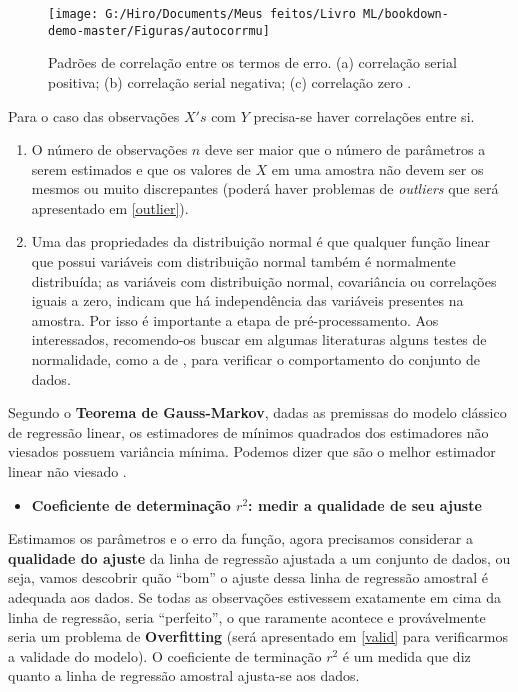 \documentclass[
]{book}
\providecommand{\tightlist}{%
  \setlength{\itemsep}{0pt}\setlength{\parskip}{0pt}}
\begin{document}
\begin{figure}

{\centering \texttt{[image: G:/Hiro/Documents/Meus feitos/Livro ML/bookdown-demo-master/Figuras/autocorrmu]} 

}

\caption{Padrões de correlação entre os termos de erro. (a) correlação serial positiva; (b) correlação serial negativa; (c) correlação zero \citet{gujarati2011econometria}.}\label{fig:autocorrmu}
\end{figure}



Para o caso das observações \(X's\) com \(Y\) precisa-se haver correlações entre si.

\begin{enumerate}
\def\labelenumi{\arabic{enumi}.}
\setcounter{enumi}{4}
\item
  O número de observações \(n\) deve ser maior que o número de parâmetros a serem estimados e que os valores de \(X\) em uma amostra não devem ser os mesmos ou muito discrepantes (poderá haver problemas de \emph{outliers} que será apresentado em \ref{outlier}).
\item
  Uma das propriedades da distribuição normal é que qualquer função linear que possui variáveis com distribuição normal também é normalmente distribuída; as variáveis com distribuição normal, covariância ou correlações iguais a zero, indicam que há independência das variáveis presentes na amostra. Por isso é importante a etapa de pré-processamento. Aos interessados, recomendo-os buscar em algumas literaturas alguns testes de normalidade, como a de \citep{shapiro1965analysis}, para verificar o comportamento do conjunto de dados.
\end{enumerate}

Segundo o \textbf{Teorema de Gauss-Markov}, dadas as premissas do modelo clássico de regressão linear, os estimadores de mínimos quadrados dos estimadores não viesados possuem variância mínima. Podemos dizer que são o melhor estimador linear não viesado \citep{gujarati2011econometria}.

\begin{itemize}
\tightlist
\item
  \textbf{Coeficiente de determinação \(r^2\): medir a qualidade de seu ajuste}
\end{itemize}

Estimamos os parâmetros e o erro da função, agora precisamos considerar a \textbf{qualidade do ajuste} da linha de regressão ajustada a um conjunto de dados, ou seja, vamos descobrir quão ``bom'' o ajuste dessa linha de regressão
amostral é adequada aos dados. Se todas as observações estivessem exatamente em cima da linha de regressão, seria ``perfeito'', o que raramente acontece e provávelmente seria um problema de \textbf{Overfitting} (será apresentado em \ref{valid} para verificarmos a validade do modelo). O coeficiente de terminação \(r^2\) é um medida que diz quanto a linha de regressão
amostral ajusta-se aos dados.
\end{document}

